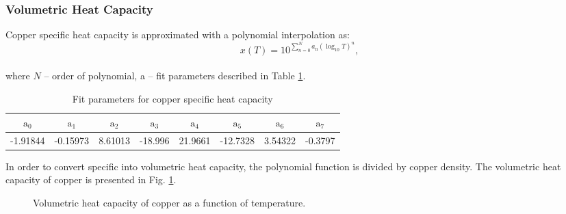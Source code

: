 \subsubsection{Volumetric Heat Capacity}
Copper specific heat capacity is approximated with a polynomial interpolation as: 
\begin{equation}
    x(T) = 10^{\sum_{n=0}^{N} a_\text{n}(\log_\text{10}T)^{n}},
\end{equation}
\\
where $N$ -- order of polynomial, a -- fit parameters described in Table \ref{table:nist_cu_cp_parameters}. 

\begin{table}[h!]
    \caption{Fit parameters for copper specific heat capacity} 
    \vspace{-1.em} 
    \fontsize{10}{10}
    \selectfont 
    \renewcommand{\arraystretch}{1.5}
    \begin{center}
    \begin{tabular}{ cccccccc }  
    $\text{a}_0$ & $\text{a}_1$ & $\text{a}_2$ & $\text{a}_3$ & $\text{a}_4$ & $\text{a}_5$ & $\text{a}_6$ & $\text{a}_7$ \\
    \hline
    -1.91844 & -0.15973 & 8.61013 & -18.996 & 21.9661 & -12.7328 & 3.54322 & -0.3797 \\
    \hline 
    \end{tabular}
    \end{center}  
     \label{table:nist_cu_cp_parameters} 
 \end{table}
 
In order to convert specific into volumetric heat capacity, the polynomial function is divided by copper density. The volumetric heat capacity of copper is presented in Fig. \ref{fig:cu_cv_plot}.

\begin{figure}[h]
\centering
{}
    \caption{Volumetric heat capacity of copper as a function of temperature.}
    \label{fig:cu_cv_plot}
\end{figure}
